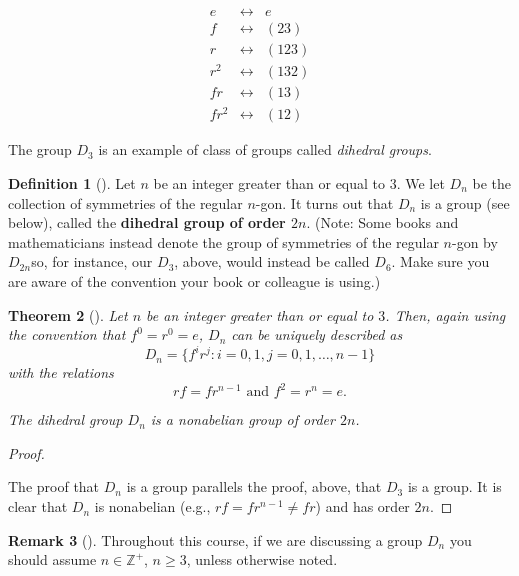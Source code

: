 \documentclass[10pt,]{book}
\newcommand{\terminology}[1]{\textbf{#1}}
\theoremstyle{plain}
\newtheorem{theorem}{Theorem}[section]
\theoremstyle{definition}
\newtheorem{definition}[theorem]{Definition}
\theoremstyle{definition}
\newtheorem{remark}[theorem]{Remark}
\theoremstyle{definition}
\theoremstyle{definition}
\numberwithin{equation}{section}
\def\Z{\mathbb{Z}}
\newcommand{\amp}{&}
\begin{document}
\begin{equation*}
\begin{array}{ccl}
e \amp \leftrightarrow \amp  e\\
f \amp \leftrightarrow \amp  (23)\\
r \amp \leftrightarrow \amp  (123)\\
r^2 \amp \leftrightarrow \amp  (132)\\
fr \amp \leftrightarrow \amp  (13)\\
fr^2 \amp \leftrightarrow \amp  (12)
\end{array}
\end{equation*}
%
\par
The group \(D_3\) is an example of class of groups called \emph{dihedral groups}.%
\begin{definition}[{}]\label{definition-53}
Let \(n\) be an integer greater than or equal to \(3\). We let \(D_n\) be the collection of symmetries of the regular \(n\)-gon. It turns out that \(D_n\) is a group (see below), called the \terminology{dihedral group of order \(2n\)}. (Note: Some books and mathematicians instead denote the group of symmetries of the regular \(n\)-gon by \(D_{2n}\)\textemdash{}so, for instance, our \(D_3\), above, would instead be called \(D_6\). Make sure you are aware of the convention your book or colleague is using.)%
\end{definition}
\begin{theorem}[{}]\label{rf}
Let \(n\) be an integer greater than or equal to \(3\). Then, again using the convention that \(f^0=r^0=e\), \(D_n\) can be uniquely described as%
\begin{equation*}
D_n=\{f^ir^j: i=0,1, j=0,1,\ldots, n-1\}
\end{equation*}
with the relations%
\begin{equation*}
rf=fr^{n-1} \text{ and }  f^2=r^n=e.
\end{equation*}
%
\par
The dihedral group \(D_n\) is a nonabelian group of order \(2n\).%
\end{theorem}
\begin{proof}\hypertarget{proof-32}{}
The proof that \(D_n\) is a group parallels the proof, above, that \(D_3\) is a group. It is clear that \(D_n\) is nonabelian (e.g., \(rf=fr^{n-1}\neq fr\)) and has order \(2n\).%
\end{proof}
\begin{remark}[]\label{remark-32}
Throughout this course, if we are discussing a group \(D_n\) you should assume \(n\in \Z^+\), \(n\geq 3\), unless otherwise noted.%
\end{remark}
\end{document}
